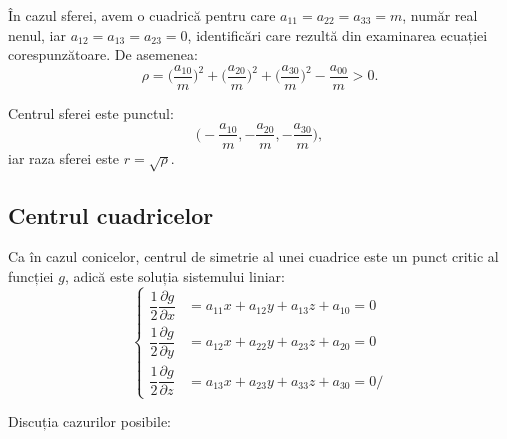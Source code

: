 \documentclass[11pt,a4paper]{article}
\theoremstyle{dotless}
\theoremstyle{dotlessdr}
\begin{document}
În cazul sferei, avem o cuadrică pentru care $a_{11} = a_{22} = a_{33} = m$,
număr real nenul, iar $a_{12} = a_{13} = a_{23} = 0$, identificări care rezultă
din examinarea ecuației corespunzătoare. De asemenea: 
 \[
	\rho = \Big( \dfrac{a_{10}}{m} \Big)^2 + 
	        \Big( \dfrac{a_{20}}{m} \Big)^2 + 
	        \Big( \dfrac{a_{30}}{m} \Big)^2 -
	        \dfrac{a_{00}}{m} > 0.
\]

Centrul sferei este punctul: \[
	\Big( -\dfrac{a_{10}}{m}, - \dfrac{a_{20}}{m}, - \dfrac{a_{30}}{m} \Big),
\]
iar raza sferei este $r = \sqrt{\rho}$.


\subsection{Centrul cuadricelor}

\indent\indent Ca în cazul conicelor, centrul de simetrie al unei cuadrice
este un punct critic al funcției $g$, adică este soluția sistemului liniar: 
 \[
	\begin{cases}	
	    \dfrac{1}{2} \dfrac{\partial g}{\partial x} &=
	    a_{11} x + a_{12}y + a_{13} z + a_{10} = 0 \\
	    \dfrac{1}{2} \dfrac{\partial g}{\partial y} &= 
	    a_{12} x + a_{22} y + a_{23} z + a_{20} = 0 \\
	    \dfrac{1}{2} \dfrac{\partial g}{\partial z} &= 
	    a_{13} x + a_{23}y + a_{33} z + a_{30} = 0/
    \end{cases}
\]

Discuția cazurilor posibile:
\end{document}
